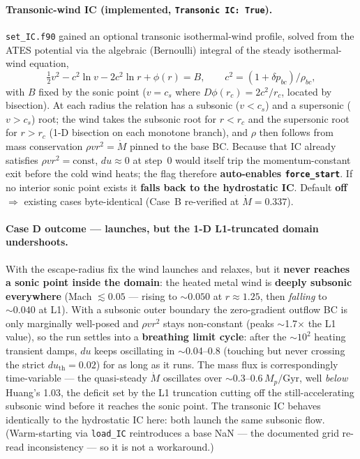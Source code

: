 \documentclass[english,a4paper]{kiseon_memo}
\begin{document}
\paragraph{Transonic-wind IC (implemented, \texttt{Transonic IC: True}).}
\texttt{set\_IC.f90} gained an optional transonic isothermal-wind profile, solved from
the ATES potential via the algebraic (Bernoulli) integral of the steady isothermal-wind
equation,
\[
\tfrac12 v^2 - c^2\ln v - 2c^2\ln r + \phi(r) = B,\qquad c^2=(1+\delta p_{bc})/\rho_{bc},
\]
with \(B\) fixed by the sonic point (\(v=c_s\) where \(D\phi(r_c)=2c^2/r_c\), located by
bisection). At each radius the relation has a subsonic (\(v<c_s\)) and a supersonic
(\(v>c_s\)) root; the wind takes the subsonic root for \(r<r_c\) and the supersonic root
for \(r>r_c\) (1-D bisection on each monotone branch), and \(\rho\) then follows from
mass conservation \(\rho v r^2=\dot M\) pinned to the base BC. Because that IC already
satisfies \(\rho v r^2=\mathrm{const}\), \(du\approx0\) at step~0 would itself trip the
momentum-constant exit before the cold wind heats; the flag therefore \textbf{auto-enables
\texttt{force\_start}}. If no interior sonic point exists it \textbf{falls back to the
hydrostatic IC}. Default \textbf{off} \(\Rightarrow\) existing cases byte-identical
(Case~B re-verified at \(\dot M=0.337\)).

\paragraph{Case D outcome --- launches, but the 1-D L1-truncated domain undershoots.}
With the escape-radius fix the wind launches and relaxes, but it \textbf{never reaches a
sonic point inside the domain}: the heated metal wind is \textbf{deeply subsonic
everywhere} (Mach \(\lesssim0.05\) --- rising to \(\sim0.050\) at \(r\approx1.25\), then
\emph{falling} to \(\sim0.040\) at L1). With a subsonic outer boundary the zero-gradient
outflow BC is only marginally well-posed and \(\rho v r^2\) stays non-constant (peaks
\(\sim\)1.7\(\times\) the L1 value), so the run settles into a \textbf{breathing limit
cycle}: after the \(\sim10^2\) heating transient damps, \(du\) keeps oscillating in
\(\sim\)0.04--0.8 (touching but never crossing the strict \(du_{\mathrm{th}}=0.02\)) for
as long as it runs. The mass flux is correspondingly time-variable --- the quasi-steady
\(\dot M\) oscillates over \(\sim\)0.3--0.6\,\(M_p/\mathrm{Gyr}\), well \emph{below}
Huang's 1.03, the deficit set by the L1 truncation cutting off the still-accelerating
subsonic wind before it reaches the sonic point. The transonic IC behaves identically to
the hydrostatic IC here: both launch the same subsonic flow.
(Warm-starting via \texttt{load\_IC} reintroduces a base NaN --- the documented grid
re-read inconsistency --- so it is not a workaround.)
\end{document}
